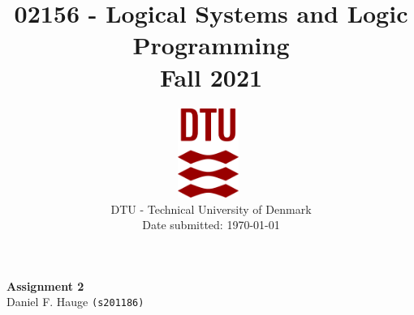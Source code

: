 \documentclass[a4paper]{article}
\begin{document}
\title{02156 - Logical Systems and Logic Programming\\Fall 2021}
\author{
\includegraphics[width=0.15\textwidth]{images/dtu.eps}~\\[1cm]
    DTU - Technical University of Denmark
    \\[0.5cm]
    Date submitted: \today
    \\
}
\date{} %
\color{black}
\maketitle
\begin{center}
{ \huge \bfseries Assignment 2}\\

\vspace{.25cm}
Daniel F. Hauge \texttt{(s201186)}\\


\vspace{.25cm}
\end{center}


\medskip
\newpage


\end{document}
